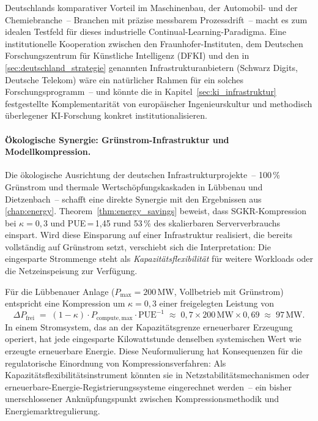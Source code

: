 \documentclass[12pt, a4paper, openany]{report}
\begin{document}
Deutschlands komparativer Vorteil im Maschinenbau, der Automobil- und
der Chemiebranche~-- Branchen mit präzise messbarem
Prozessdrift~-- macht es zum idealen Testfeld für dieses industrielle
Continual-Learning-Paradigma.  Eine institutionelle Kooperation zwischen
den Fraunhofer-Instituten, dem Deutschen Forschungszentrum für
Künstliche Intelligenz (DFKI) und den in
\cref{sec:deutschland_strategie} genannten Infrastrukturanbietern
(Schwarz Digits, Deutsche Telekom) wäre ein natürlicher Rahmen für ein
solches Forschungsprogramm~-- und könnte die in
Kapitel~\ref{sec:ki_infrastruktur} festgestellte Komplementarität von
europäischer Ingenieurskultur und methodisch überlegener KI-Forschung
konkret institutionalisieren.

\paragraph{Ökologische Synergie: Grünstrom-Infrastruktur und
  Modellkompression.}
Die ökologische Ausrichtung der deutschen Infrastrukturprojekte~--
100\,\% Grünstrom und thermale Wertschöpfungskaskaden in Lübbenau
und Dietzenbach~-- schafft eine direkte Synergie mit den Ergebnissen
aus \cref{chap:energy}.  Theorem~\ref{thm:energy_savings} beweist,
dass SGKR-Kompression bei $\kappa = 0{,}3$ und PUE\,=\,1{,}45 rund
53\,\% des skalierbaren Serververbrauchs einspart.  Wird diese
Einsparung auf einer Infrastruktur realisiert, die bereits vollständig
auf Grünstrom setzt, verschiebt sich die Interpretation: Die eingesparte
Strommenge steht als \emph{Kapazitätsflexibilität} für weitere
Workloads oder die Netzeinspeisung zur Verfügung.

Für die Lübbenauer Anlage ($P_{\mathrm{max}} = 200$\,MW, Vollbetrieb
mit Grünstrom) entspricht eine Kompression um $\kappa = 0{,}3$ einer
freigelegten Leistung von
\[
  \Delta P_{\mathrm{frei}}
  \;=\; (1 - \kappa) \cdot P_{\mathrm{compute,max}} \cdot \mathrm{PUE}^{-1}
  \;\approx\; 0{,}7 \times 200\,\mathrm{MW} \times 0{,}69
  \;\approx\; 97\,\mathrm{MW}.
\]
In einem Stromsystem, das an der Kapazitätsgrenze erneuerbarer Erzeugung
operiert, hat jede eingesparte Kilowattstunde denselben systemischen
Wert wie erzeugte erneuerbare Energie.  Diese Neuformulierung hat
Konsequenzen für die regulatorische Einordnung von
Kompressionsverfahren: Als Kapazitätsflexibilitätsinstrument könnten
sie in Netzstabilitätsmechanismen oder
erneuerbare-Energie-Registrierungssysteme eingerechnet werden~-- ein
bisher unerschlossener Anknüpfungspunkt zwischen Kompressionsmethodik
und Energiemarktregulierung.
\end{document}
